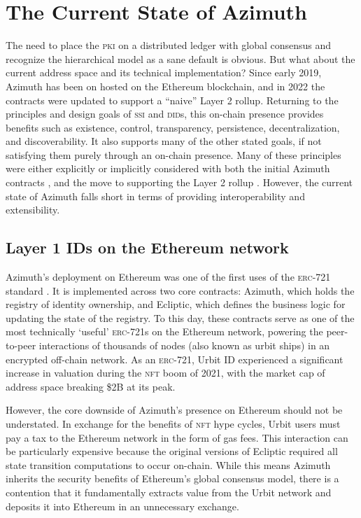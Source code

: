 \documentclass[twoside]{article}
\begin{document}
\section{The Current State of Azimuth}

The need to place the \textsc{pki} on a distributed ledger with global consensus and recognize the hierarchical model as a sane default is obvious. But what about the current address space and its technical implementation? Since early 2019, Azimuth has been on hosted on the Ethereum blockchain, and in 2022 the contracts were updated to support a ``naive'' Layer 2 rollup. Returning to the principles and design goals of \textsc{ssi} and \textsc{did}s, this on-chain presence provides benefits such as existence, control, transparency, persistence, decentralization, and discoverability. It also supports many of the other stated goals, if not satisfying them purely through an on-chain presence. Many of these principles were either explicitly or implicitly considered with both the initial Azimuth contracts \citep{WolfePaul2019}, and the move to supporting the Layer 2 rollup \citep{Paprocki2021}. However, the current state of Azimuth falls short in terms of providing interoperability and extensibility.

\subsection{Layer 1 IDs on the Ethereum network}

Azimuth's deployment on Ethereum was one of the first uses of the \textsc{erc}-721 standard \citep{ERC721}. It is implemented across two core contracts: Azimuth, which holds the registry of identity ownership, and Ecliptic, which defines the business logic for updating the state of the registry. To this day, these contracts serve as one of the most technically `useful' \textsc{erc}-721s on the Ethereum network, powering the peer-to-peer interactions of thousands of nodes (also known as urbit ships) in an encrypted off-chain network. As an \textsc{erc}-721, Urbit ID experienced a significant increase in valuation during the \textsc{nft} boom of 2021, with the market cap of address space breaking \$2B at its peak.

However, the core downside of Azimuth's presence on Ethereum should not be understated. In exchange for the benefits of \textsc{nft} hype cycles, Urbit users must pay a tax to the Ethereum network in the form of gas fees. This interaction can be particularly expensive because the original versions of Ecliptic required all state transition computations to occur on-chain. While this means Azimuth inherits the security benefits of Ethereum's global consensus model, there is a contention that it fundamentally extracts value from the Urbit network and deposits it into Ethereum in an unnecessary exchange.
\end{document}
